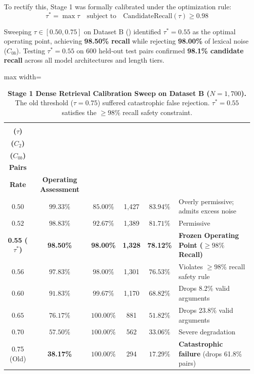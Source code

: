 \documentclass[11pt,a4paper]{article}
\begin{document}
To rectify this, Stage 1 was formally calibrated under the optimization rule:
\begin{equation}
\tau^* = \max \tau \quad \text{subject to} \quad \text{CandidateRecall}(\tau) \ge 0.98
\end{equation}

Sweeping $\tau \in [0.50, 0.75]$ on Dataset B () identified \textbf{$\tau^* = 0.55$} as the optimal operating point, achieving \textbf{98.50\% recall} while rejecting \textbf{98.00\%} of lexical noise ($C_{0b}$). Testing $\tau^* = 0.55$ on 600 held-out test pairs confirmed \textbf{98.1\% candidate recall} across all model architectures and length tiers.

\begin{table}[htbp]
\centering
\small
\caption{\textbf{Stage 1 Dense Retrieval Calibration Sweep on Dataset B ($N = 1,700$).} The old threshold ($\tau = 0.75$) suffered catastrophic false rejection. $\tau^* = 0.55$ satisfies the $\ge 98\%$ recall safety constraint.}
\label{tab:stage1_sweep}
\begin{adjustbox}{max width=\linewidth}
\begin{tabular}{c c c c c l}
\toprule
\makecell{\textbf{Threshold}\\\textbf{($\tau$)}} & \makecell{\textbf{Candidate Recall}\\\textbf{($C_2$)}} & \makecell{\textbf{Noise Rejection}\\\textbf{($C_{0b}$)}} & \makecell{\textbf{Passed}\\\textbf{Pairs}} & \makecell{\textbf{Pass}\\\textbf{Rate}} & \textbf{Operating Assessment} \\
\midrule
$0.50$ & $99.33\%$ & $85.00\%$ & 1,427 & $83.94\%$ & Overly permissive; admits excess noise \\
$0.52$ & $98.83\%$ & $92.67\%$ & 1,389 & $81.71\%$ & Permissive \\
\textbf{0.55 ($\tau^*$)} & \textbf{98.50\%} & \textbf{98.00\%} & \textbf{1,328} & \textbf{78.12\%} & \textbf{Frozen Operating Point ($\ge 98\%$ Recall)} \\
$0.56$ & $97.83\%$ & $98.00\%$ & 1,301 & $76.53\%$ & Violates $\ge 98\%$ recall safety rule \\
$0.60$ & $91.83\%$ & $99.67\%$ & 1,170 & $68.82\%$ & Drops 8.2\% valid arguments \\
$0.65$ & $76.17\%$ & $100.00\%$ & 881 & $51.82\%$ & Drops 23.8\% valid arguments \\
$0.70$ & $57.50\%$ & $100.00\%$ & 562 & $33.06\%$ & Severe degradation \\
0.75 (Old) & \textbf{38.17\%} & $100.00\%$ & 294 & $17.29\%$ & \textbf{Catastrophic failure} (drops 61.8\% pairs) \\
\bottomrule
\end{tabular}
\end{adjustbox}
\end{table}
\end{document}
